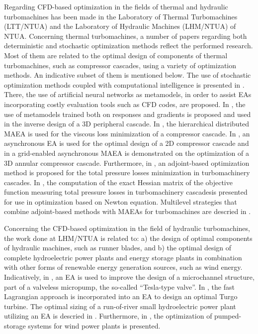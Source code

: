 Regarding CFD-based optimization in the fields of thermal and hydraulic turbomachines has been made in the Laboratory of Thermal Turbomachines (LTT/NTUA) and the Laboratory of Hydraulic Machines (LHM/NTUA) of NTUA. 
Concerning thermal turbomachines, a number of papers regarding both deterministic and stochastic optimization methods reflect the performed research. Most of them are related to the optimal design of components of thermal turbomachines, such as compressor cascades, using a variety of optimization methods.  An indicative subset of them is mentioned below. The use of stochastic optimization methods coupled with computational intelligence is presented in \cite{LTT_2_018,LTT_2_020,LTT_2_023}. There, the use of artificial neural networks as metamodels, in order to assist  EAs incorporating costly evaluation tools such as CFD codes, are proposed. In \cite{LTT_2_026}, the use of metamodels trained both on responses and gradients is proposed and used in the inverse design of a 3D peripheral cascade. In \cite{LTT_2_031}, the hierarchical distributed MAEA is used for the viscous loss minimization of a compressor cascade. In \cite{LTT_2_040}, an asynchronous EA is used for the optimal design of a 2D compressor cascade and in \cite{LTT_2_045} a grid-enabled asynchronous MAEA is demonstrated on the optimization of a 3D annular compressor cascade. Furthermore, in \cite{LTT_2_032}, an adjoint-based optimization method is proposed for the total pressure losses minimization in turbomachinery cascades.  In \cite{LTT_2_049},  the computation of the exact Hessian matrix of the objective function measuring total pressure losses in turbomachinery cascadesis presented for use in optimization based on Newton equation. Multilevel strategies that combine adjoint-based methods with MAEAs for turbomachines are descried in \cite{LTT_3_092}.


Concerning the CFD-based optimization in the field of hydraulic turbomachines, the work done at LHM/NTUA is related to: a) the design of optimal components of hydraulic machines, such as runner blades, and b) the optimal design of complete hydroelectric power plants and energy storage plants in combination with other forms of renewable energy generation sources, such as wind energy. Indicatively, in \cite{Anagno2}, an EA is used to improve the design of a microchannel structure, part of a valveless micropump, the so-called ``Tesla-type valve''. In \cite{Anagno4}, the fast Lagrangian approach is incorporated into an EA to design an optimal Turgo turbine. The optimal sizing of a run-of-river small hydroelectric power plant utilizing an EA is descried in \cite{Anagno3}. Furthermore, in \cite{Anagno5,Anagno6}, the optimization of pumped-storage systems for wind power plants is presented.

